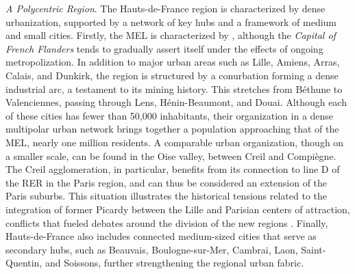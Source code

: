 \begin{refsegment}
\textsl{A Polycentric Region}. The Hauts-de-France region is characterized by dense urbanization, supported by a network of key hubs and a framework of medium and small cities. Firstly, the \acrshort{MEL} is characterized by  \textcolor{blue}{\autocite[37]{mignot_formes_2007}}, although the \textsl{Capital of French Flanders} tends to gradually assert itself under the effects of ongoing metropolization. In addition to major urban areas such as Lille, Amiens, Arras, Calais, and Dunkirk, the region is structured by a \gls{conurbation} forming a dense industrial arc, a testament to its mining history. This  \textcolor{blue}{\autocite[]{mission_bassin_minier_nord-pas-de-calais_portrait_nodate}} stretches from Béthune to Valenciennes, passing through Lens, Hénin-Beaumont, and Douai. Although each of these cities has fewer than 50,000 inhabitants, their organization in a dense multipolar urban network brings together a population approaching that of the \acrshort{MEL}, nearly one million residents. A comparable urban organization, though on a smaller scale, can be found in the Oise valley, between Creil and Compiègne. The Creil agglomeration, in particular, benefits from its connection to line D of the \acrfull{RER} in the Paris region, and can thus be considered an extension of the Paris suburbs. This situation illustrates the historical tensions related to the integration of former Picardy between the Lille and Parisian centers of attraction, conflicts that fueled debates around the division of the new regions \textcolor{blue}{\autocite[154]{plouvier_questionner_2023}}. Finally, Hauts-de-France also includes connected medium-sized cities that serve as secondary hubs, such as Beauvais, Boulogne-sur-Mer, Cambrai, Laon, Saint-Quentin, and Soissons, further strengthening the regional urban fabric.%


\end{refsegment}
